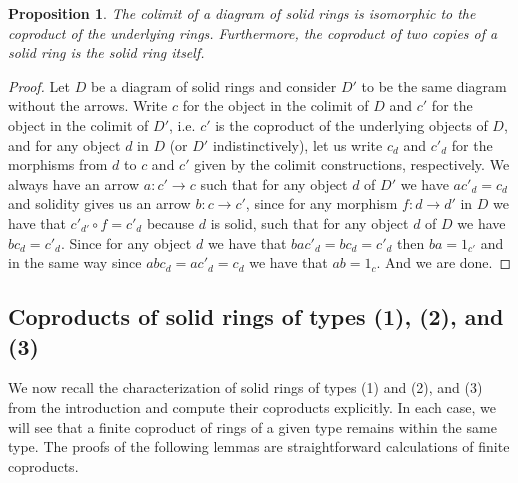 \documentclass{amsart}
\newtheorem{proposition}[subsection]{Proposition}
\begin{document}
    \begin{proposition}
    \label{prp:co_solid_2}
        The colimit of a diagram of solid rings is isomorphic to the coproduct of the underlying rings.
        Furthermore, the coproduct of two copies of a solid ring is the solid ring itself.
    \end{proposition}
    \begin{proof}
        Let $D$ be a diagram of solid rings and consider $D'$ to be the same diagram without the arrows.
        Write $c$ for the object in the colimit of $D$ and $c'$ for the object in the colimit of $D'$, i.e. $c'$ is the coproduct of the underlying objects of $D$, and for any object $d$ in $D$ (or $D'$ indistinctively), let us write $c_d$ and $c'_d$ for the morphisms from $d$ to $c$ and $c'$ given by the colimit constructions, respectively.
        We always have an arrow $a: c' \to c$ such that for any object $d$ of $D'$ we have $ac'_d = c_d$ and solidity gives us an arrow $b: c \to c'$, since for any morphism $f: d \to d'$ in $D$ we have that $c'_{d'} \circ f = c'_d$ because $d$ is solid, such that for any object $d$ of $D$ we have $bc_d = c'_d$.
        Since for any object $d$ we have that $bac'_d = bc_d = c'_d$ then $ba = 1_{c'}$ and in the same way since $abc_d = ac'_d = c_d$ we have that $ab = 1_c$.
        And we are done.
    \end{proof}

    \subsection{Coproducts of solid rings of types (1), (2), and (3)}
    \label{sbs:cop}

    We now recall the characterization of solid rings of types (1) and (2), and (3) from the introduction and compute their coproducts explicitly.
    In each case, we will see that a finite coproduct of rings of a given type remains within the same type.
    The proofs of the following lemmas are straightforward calculations of finite coproducts.
\end{document}
